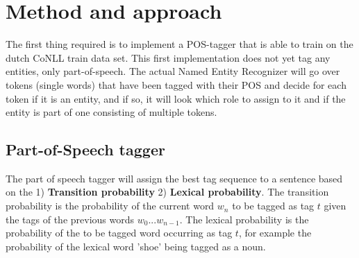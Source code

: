 \documentclass{article}
\begin{document}
\section{Method and approach}
The first thing required is to implement a POS-tagger that is able to train on the dutch CoNLL train data set.  This first implementation does not yet tag any entities, only part-of-speech. The actual Named Entity Recognizer will go over tokens (single words) that have been tagged with their POS and decide for each token if it is an entity, and if so, it will look which role to assign to it and if the entity is part of one consisting of multiple tokens. 

\subsection{Part-of-Speech tagger}
The part of speech tagger will assign the best tag sequence to a sentence based on the 1) \textbf{Transition probability} 2) \textbf{Lexical probability}. The transition probability is the probability of the current word $w_n$ to be tagged as tag $t$ given the tags of the previous words $w_0 ... w_{n-1}$. The lexical probability is the probability of the to be tagged word occurring as tag $t$, for example the probability of the lexical word 'shoe' being tagged as a noun.
\end{document}
